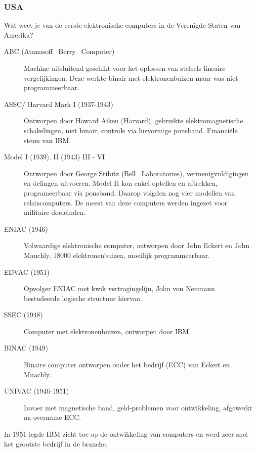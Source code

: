 \documentclass[../main.tex]{subfiles}
\begin{document}
\subsubsection{USA}
\begin{question} Wat weet je van de eerste elektronische computers in de Verenigde Staten van Amerika?  \end{question}
\begin{solution}
	\begin{description}
		\item[ABC (Atanasoff  Berry  Computer)]
		Machine uitsluitend geschikt voor het oplossen van stelsels lineaire vergelijkingen. Deze werkte binair met elektronenbuizen maar was niet programmeerbaar.
		\item[ASSC/ Harvard Mark I (1937-1943)]
		Ontworpen door Howard Aiken (Harvard), gebruikte elektromagnetische schakelingen, niet binair, controle via lusvormige ponsband. Financi\"ele steun van IBM.
		\item[Model I (1939), II (1943) III - VI ]
		Ontworpen door George Stibitz (Bell  Laboratories), vermenigvuldigingen en delingen uitvoeren. Model II  kon enkel optellen en aftrekken, programeerbaar via ponsband. Daarop volgden nog vier modellen van relaiscomputers. De meest van deze computers werden ingezet voor militaire doeleinden.
		\item[ENIAC (1946)]
		Volwaardige elektronische computer, ontworpen door John Eckert en John Mauchly, 18000 elektronenbuizen, moeilijk programmeerbaar.
		\item[EDVAC (1951)]
		Opvolger ENIAC met kwik vertragingslijn, John von Neumann bestudeerde logische structuur hiervan.
		\item[SSEC (1948)]
		Computer met elektronenbuizen, ontworpen door IBM
		\item[BINAC (1949)]
		Binaire computer ontworpen onder het bedrijf (ECC) van Eckert en Muachly.
		\item[UNIVAC (1946-1951)]
		Invoer met magnetische band, geld-problemen voor ontwikkeling, afgewerkt na overname ECC.
	\end{description}

	In 1951 legde IBM zicht toe op de ontwikkeling van computers en werd zeer snel het grootste bedrijf in de branche.
\end{solution}
\end{document}
